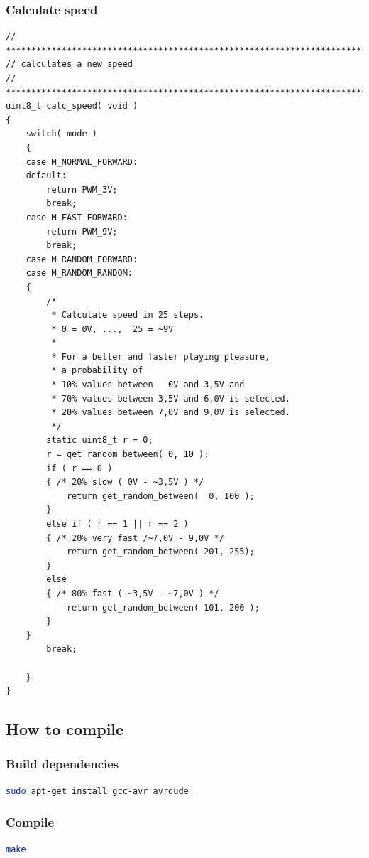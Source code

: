 \subsubsection{Calculate speed}
\begin{lstlisting}[caption={Calculate Speed},label=lst:calcspeed]
// ****************************************************************************
// calculates a new speed
// ***************************************************************************/
uint8_t calc_speed( void )
{
	switch( mode )
	{
	case M_NORMAL_FORWARD:
	default:
		return PWM_3V;
		break;
	case M_FAST_FORWARD:
		return PWM_9V;
		break;
	case M_RANDOM_FORWARD:
	case M_RANDOM_RANDOM:
	{
		/*
		 * Calculate speed in 25 steps.
		 * 0 = 0V, ...,  25 = ~9V
		 *
		 * For a better and faster playing pleasure,
		 * a probability of
		 * 10% values between   0V and 3,5V and
		 * 70% values between 3,5V and 6,0V is selected.
		 * 20% values between 7,0V and 9,0V is selected.
		 */
		static uint8_t r = 0;
		r = get_random_between( 0, 10 );
		if ( r == 0 )
		{ /* 20% slow ( 0V - ~3,5V ) */
			return get_random_between(  0, 100 );
		}
		else if ( r == 1 || r == 2 )
		{ /* 20% very fast /~7,0V - 9,0V */
			return get_random_between( 201, 255);
		}
		else
		{ /* 80% fast ( ~3,5V - ~7,0V ) */
			return get_random_between( 101, 200 );
		}
	}
		break;

	}
}
\end{lstlisting}
\vspace{0.5cm}

\subsection{How to compile}
\subsubsection{Build dependencies}
\begin{lstlisting}[caption={Build dependencies},language=sh,label=lst:builddep]
sudo apt-get install gcc-avr avrdude
\end{lstlisting}
\vspace{0.5cm}

\subsubsection{Compile}
\begin{lstlisting}[caption={Compile},language=sh,label=lst:makeall]
make
\end{lstlisting}
\vspace{0.5cm}


